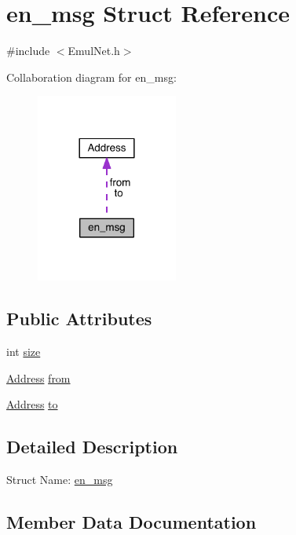 \hypertarget{structen__msg}{}\section{en\+\_\+msg Struct Reference}
\label{structen__msg}


{\ttfamily \#include $<$Emul\+Net.\+h$>$}



Collaboration diagram for en\+\_\+msg\+:\nopagebreak
\begin{figure}[H]
\begin{center}
\leavevmode
\includegraphics[width=132pt]{d3/d7d/structen__msg__coll__graph}
\end{center}
\end{figure}
\subsection*{Public Attributes}
\begin{DoxyCompactItemize}
\item 
int \hyperlink{structen__msg_a27abf25d730baec522335832f45aa326}{size}
\item 
\hyperlink{class_address}{Address} \hyperlink{structen__msg_adbad5e8a9e8b7711d36d0c5d24f1c450}{from}
\item 
\hyperlink{class_address}{Address} \hyperlink{structen__msg_a20e7e03059b603a54a98841ffcc56501}{to}
\end{DoxyCompactItemize}


\subsection{Detailed Description}
Struct Name\+: \hyperlink{structen__msg}{en\+\_\+msg} 

\subsection{Member Data Documentation}
\hypertarget{structen__msg_adbad5e8a9e8b7711d36d0c5d24f1c450}{}
